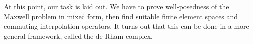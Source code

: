 \begin{remark}
  At this point, our task is laid out. We have to prove well-posedness
  of the Maxwell problem in mixed form, then find suitable finite
  element spaces and commuting interpolation operators.  It turns out
  that this can be done in a more general framework, called the de
  Rham complex.
\end{remark}

    



